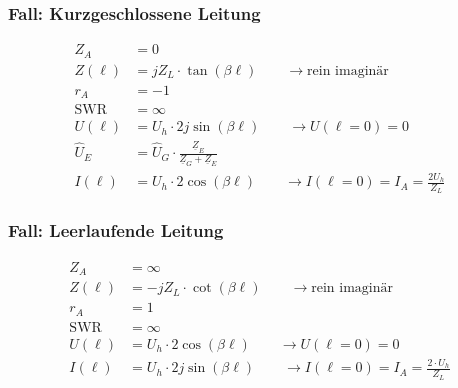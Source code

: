 \subsubsection{Fall: Kurzgeschlossene Leitung}
\begin{align*}
    Z_A          & = 0                                                                                         \\
    Z(\ell)         & = j Z_L\cdot\tan(\beta \ell)        \qquad\rightarrow\text{rein imaginär}                      \\
    r_A          & = -1                                                                                        \\
    \mathrm{SWR} & = \infty                                                                                    \\
    U(\ell)         & = U_h\cdot 2j\sin(\beta \ell)    \qquad\rightarrow U(\ell=0)=0                                    \\
    \hat{U}_E    & = \hat{U}_{G}\cdot\frac{\underline{Z}_E}{\underline{Z}_{G}+\underline{Z}_E} \\
    I(\ell)         & = U_h\cdot 2\cos(\beta \ell)    \qquad\rightarrow I(\ell=0)=I_A=\frac{2U_h}{Z_L}
\end{align*}

\subsubsection{Fall: Leerlaufende Leitung}
\begin{align*}
    Z_A          & = \infty                                                                         \\
    Z(\ell)         & = -jZ_L\cdot \cot(\beta \ell) \qquad\rightarrow\text{rein imaginär}                 \\
    r_A          & = 1                                                                              \\
    \mathrm{SWR} & = \infty                                                                         \\
    U(\ell)         & = U_h\cdot 2\cos(\beta \ell) \qquad\rightarrow U(\ell=0)=0                             \\
    I(\ell)         & = U_h\cdot 2j\sin(\beta \ell) \qquad\rightarrow I(\ell=0)=I_A = \frac{2\cdot U_h}{Z_L}
\end{align*}


